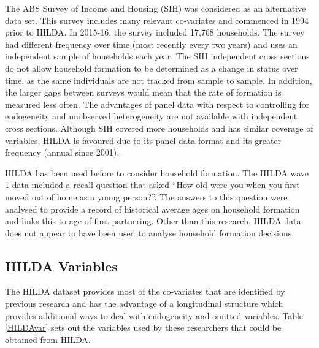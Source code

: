 \documentclass[12pt]{article}
\begin{document}
The ABS Survey of Income and Housing (SIH) was considered as an alternative data set. This survey includes many relevant co-variates and commenced in 1994 prior to HILDA. In 2015-16, the survey included 17,768 households. The survey had different frequency over time (most recently every two years) and uses an independent sample of households each year. The SIH independent cross sections do not allow household formation to be determined as a change in status over time, as the same individuals are not tracked from sample to sample. In addition, the larger gaps between surveys would mean that the rate of formation is measured less often. The advantages of panel data with respect to controlling for endogeneity and unobserved heterogeneity are not available with independent cross sections. Although SIH covered more households and has similar coverage of variables, HILDA is favoured due to its panel data format and its greater frequency (annual since 2001).

HILDA has been used before to consider household formation. The HILDA wave 1 data included a recall question that asked ``How old were you when you first moved out of home as a young person?''. The answers to this question were analysed to provide a record of historical average ages on household formation \parencite{flatau2007leaving} and links this to age of first partnering. Other than this research, HILDA data does not appear to have been used to analyse household formation decisions.

\subsection{HILDA Variables}

The HILDA dataset provides most of the co-variates that are identified by previous research \parencites{lee2013happens, byrne2014household} and has the advantage of a longitudinal structure which provides additional ways to deal with endogeneity and omitted variables. Table \ref{HILDAvar} sets out the variables used by these researchers that could be obtained from HILDA.
\end{document}
